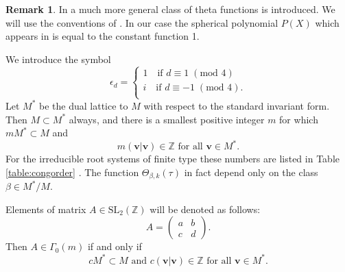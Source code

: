 \documentclass[11pt,a4paper]{amsart}
\theoremstyle{definition}
\newtheorem{remark}[theorem]{Remark}
\newcommand{\SZ}{\mathbb{Z}}                    %
\begin{document}
\begin{remark} In \cite[Chapter 14]{cohen2017modular} a much more general class of theta functions is introduced. We will use the conventions of \cite[Example 14.2.5 and Definition 14.3.3]{cohen2017modular}. In our case the spherical polynomial $P(X)$ which appears in \cite[14.2.5]{cohen2017modular} is equal to the constant function 1.
\end{remark}


We introduce the symbol 
\begin{equation}
\label{eq:epsilondef}
\epsilon_d  = \begin{cases}
1 \quad \textrm{if } d\equiv 1 \; (\textrm{mod } 4) \\
i \quad \textrm{if } d\equiv -1 \; (\textrm{mod } 4). \\
\end{cases}
\end{equation}
Let $M^{\ast}$ be the dual lattice to $M$ with respect to the standard invariant form. Then $M \subset M^{\ast}$ always, and there is a smallest positive integer $m$ for which  $mM^{\ast} \subset M$ and 
\[m(\mathbf{v} | \mathbf{v}) \in \SZ \textrm{ for all } \mathbf{v} \in M^{\ast}.\]
For the irreducible root systems of finite type these numbers are listed in Table \ref{table:congorder} \cite[page 261]{kac1994infinite}. The function $\Theta_{\beta,k}(\tau)$ in fact depend only on the class $\beta \in M^{\ast} / M$.

Elements of matrix $A \in \mathrm{SL}_2(\SZ)$ will be denoted as follows:
\begin{equation}
\label{eq:matrix}
A=\begin{pmatrix}
	a & b \\ c & d
	\end{pmatrix}.\end{equation}
Then $A \in \Gamma_0(m)$ if and only if
\[  cM^{\ast} \subset M \textrm{ and } c(\mathbf{v} | \mathbf{v}) \in \SZ \textrm{ for all } \mathbf{v} \in M^{\ast}. \]
\end{document}
